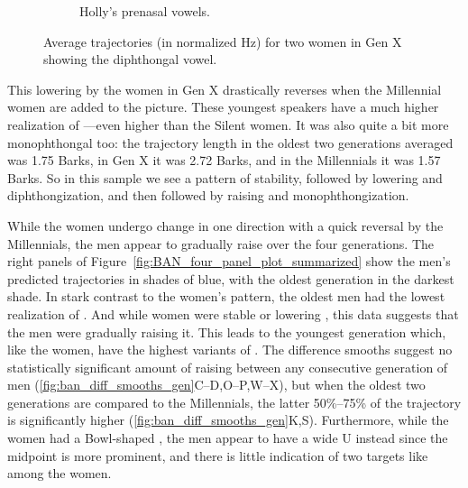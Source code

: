 \begin{figure}[tb!]
\begin{subfigure}[t]{2.925in}
        \caption{Holly's prenasal vowels.}
        \label{fig:holly_prenasal}
    \end{subfigure}
    \hspace{\fill}
    \caption{Average trajectories (in normalized Hz) for two women in Gen X showing the diphthongal \ban vowel.}
    \label{fig:kim_and_holly}
\end{figure}

This lowering by the women in Gen X drastically reverses when the Millennial women are added to the picture. These youngest speakers have a much higher realization of \ban---even higher than the Silent women. It was also quite a bit more monophthongal too: the trajectory length in the oldest two generations averaged was 1.75 Barks, in Gen X it was 2.72 Barks, and in the Millennials it was 1.57 Barks. So in this sample we see a pattern of stability, followed by lowering and diphthongization, and then followed by raising and monophthongization.

While the women undergo change in one direction with a quick reversal by the Millennials, the men appear to gradually raise \ban over the four generations. The right panels of Figure~\ref{fig:BAN_four_panel_plot_summarized} show the men's predicted trajectories in shades of blue, with the oldest generation in the darkest shade. In stark contrast to the women's pattern, the oldest men had the lowest realization of \ban. And while women were stable or lowering \ban, this data suggests that the men were gradually raising it. This leads to the youngest generation which, like the women, have the highest variants of \ban. The difference smooths suggest no statistically significant amount of raising between any consecutive generation of men (\ref{fig:ban_diff_smooths_gen}C--D,O--P,W--X), but when the oldest two generations are compared to the Millennials, the latter 50\%--75\% of the trajectory is significantly higher (\ref{fig:ban_diff_smooths_gen}K,S). Furthermore, while the women had a Bowl-shaped \ban, the men appear to have a wide U instead since the midpoint is more prominent, and there is little indication of two targets like among the women.

